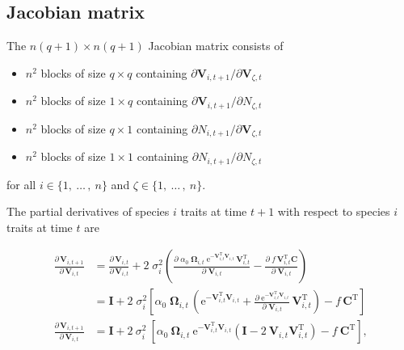 \subsection*{Jacobian matrix}

The $n(q+1) \times n(q+1)$ Jacobian matrix consists of 

\begin{itemize}
\item $n^2$ blocks of size $q \times q$ containing
    $\partial \mathbf{V}_{i,t+1} / \partial \mathbf{V}_{\zeta,t}$
\item $n^2$ blocks of size $1 \times q$ containing
    $\partial \mathbf{V}_{i,t+1} / \partial N_{\zeta,t}$
\item $n^2$ blocks of size $q \times 1$ containing
    $\partial N_{i,t+1} / \partial \mathbf{V}_{\zeta,t}$
\item $n^2$ blocks of size $1 \times 1$ containing
    $\partial N_{i,t+1} / \partial N_{\zeta,t}$
\end{itemize}


for all $i \in \{ 1, \: \ldots \, , \: n \}$
and $\zeta \in \{ 1, \: \ldots \, , \: n \}$.


The partial derivatives of species $i$ traits at time $t+1$ with respect
to species $i$ traits at time $t$ are

\begin{equation*}
\begin{split}
    \frac{ \partial \, \mathbf{V}_{i,t+1} }{ \partial \, \mathbf{V}_{i,t} } &=
        \frac{ \partial \, \mathbf{V}_{i,t} }{ \partial \, \mathbf{V}_{i,t} } +
        2 \; \sigma_i^2
        \left(
            \frac{ \partial \;
                \alpha_0 \; \mathbf{\Omega}_{i,t} \;
                    \textrm{e}^{-\mathbf{V}_{i,t}^{\textrm{T}} \mathbf{V}_{i,t}} \,
                    \mathbf{V}_{i,t}^{\textrm{T}}}{\partial \; \mathbf{V}_{i,t} } -
            \frac{ \partial \; f \, \mathbf{V}_{i,t}^{\textrm{T}} \mathbf{C}}{\partial \; \mathbf{V}_{i,t} }
        \right) \\
    &=
        \mathbf{I} +
        2 \; \sigma_i^2
        \left[
            \alpha_0 \; \mathbf{\Omega}_{i,t} \,
            \left(
                \textrm{e}^{-\mathbf{V}_{i,t}^{\textrm{T}} \mathbf{V}_{i,t}} +
                \frac{ \partial \;
                        \textrm{e}^{-\mathbf{V}_{i,t}^{\textrm{T}} \mathbf{V}_{i,t}}
                        }{\partial \; \mathbf{V}_{i,t} } \, \mathbf{V}_{i,t}^{\textrm{T}}
            \right) -
            f \, \mathbf{C}^{\textrm{T}}
            \right] \\[2ex]
    \frac{ \partial \, \mathbf{V}_{i,t+1} }{ \partial \, \mathbf{V}_{i,t} } &= \mathbf{I} + 2 ~ \sigma_i^2 ~
        \left[
            \alpha_0 ~ \mathbf{\Omega}_{i,t} ~ \textrm{e}^{ - \mathbf{V}_{i,t}^{\textrm{T}} \mathbf{V}_{i,t} }
            \left(
                \mathbf{I} - 2 ~ \mathbf{V}_{i,t} \mathbf{V}_{i,t}^{\textrm{T}}
            \right) -
            f \: \mathbf{C}^{\textrm{T}}
        \right]
    \textrm{,}
\end{split}
\end{equation*}


